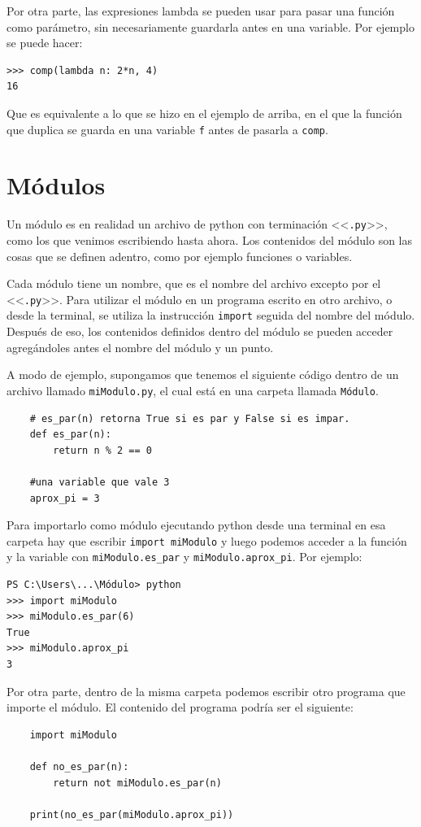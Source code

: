 \documentclass[a4paper, 12pt]{report}
\theoremstyle{definition}
\begin{document}
Por otra parte, las expresiones lambda se pueden usar para pasar una función como parámetro, sin necesariamente guardarla antes en una variable. Por ejemplo se puede hacer:
\begin{verbatim}
>>> comp(lambda n: 2*n, 4)
16
\end{verbatim}
Que es equivalente a lo que se hizo en el ejemplo de arriba, en el que la función que duplica se guarda en una variable {\tt f} antes de pasarla a {\tt comp}.
\section{Módulos}\label{sec-modulos}

Un módulo es en realidad un archivo de python con terminación <<{\tt .py}>>, como los que venimos escribiendo hasta ahora. Los contenidos del módulo son las cosas que se definen adentro, como por ejemplo funciones o variables.

Cada módulo tiene un nombre, que es el nombre del archivo excepto por el <<{\tt .py}>>. Para utilizar el módulo en un programa escrito en otro archivo, o desde la terminal, se utiliza la instrucción {\tt import} seguida del nombre del módulo. Después de eso, los contenidos definidos dentro del módulo se pueden acceder agregándoles antes el nombre del módulo y un punto.

A modo de ejemplo, supongamos que tenemos el siguiente código dentro de un archivo llamado {\tt miModulo.py}, el cual está en una carpeta llamada {\tt Módulo}.
\begin{verbatim}
	# es_par(n) retorna True si es par y False si es impar.
	def es_par(n):
	    return n % 2 == 0
	
	#una variable que vale 3
	aprox_pi = 3
\end{verbatim}
Para importarlo como módulo ejecutando python desde una terminal en esa carpeta hay que escribir {\tt import miModulo} y luego podemos acceder a la función y la variable con {\tt miModulo.es\_par} y {\tt miModulo.aprox\_pi}. Por ejemplo:
\begin{verbatim}
PS C:\Users\...\Módulo> python
>>> import miModulo
>>> miModulo.es_par(6)
True
>>> miModulo.aprox_pi
3
\end{verbatim}
Por otra parte, dentro de la misma carpeta podemos escribir otro programa que importe el módulo. El contenido del programa podría ser el siguiente:
\begin{verbatim}
	import miModulo
	
	def no_es_par(n):
	    return not miModulo.es_par(n)
	
	print(no_es_par(miModulo.aprox_pi))
\end{verbatim}
\end{document}
